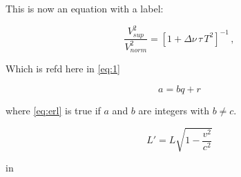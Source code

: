 This is now an equation with a label:

\begin{equation}
\label{eq:1}
\frac{V_{ sup}^2}{V_{ norm}^2} = [1 + \Delta \nu \, \tau \, T^2 ]^{-1} \, ,
\end{equation}

Which is refd here in \ref{eq:1}

\begin{equation} \label{eq:erl}
a = bq + r
\end{equation}

where \eqref{eq:erl} is true if $a$ and $b$ are integers with $b \neq c$.

\begin{equation}
\label{eq:3}
  L' = {L}{\sqrt{1-\frac{v^2}{c^2}}}
 \end{equation}

in 